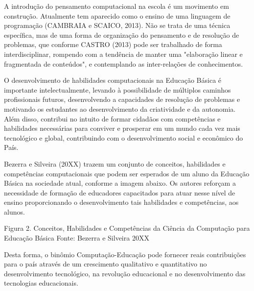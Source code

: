     
	A introdução do pensamento computacional na escola é um  movimento em construção. Atualmente tem aparecido como o ensino de uma linguagem de programação (CAMBRAIA e SCAICO, 2013). Não se trata de uma técnica específica, mas de uma forma de organização do pensamento e de resolução de problemas, que conforme CASTRO (2013) pode ser trabalhado de forma interdisciplinar, rompendo com a tendência de manter uma "elaboração linear e fragmentada de conteúdos", e contemplando as inter-relações de conhecimentos.
    
    
	O desenvolvimento de habilidades computacionais na Educação Básica é importante intelectualmente, levando à possibilidade de múltiplos caminhos profissionais futuros, desenvolvendo a capacidades de resolução de problemas e motivando os estudantes ao desenvolvimento da criatividade e da autonomia. Além disso, contribui no intuito de formar cidadãos com competências e habilidades necessárias para conviver e prosperar em um mundo cada vez mais tecnológico e global, contribuindo com o desenvolvimento social e econômico do País.
    
    
	Bezerra e Silveira (20XX) trazem um conjunto de conceitos, habilidades e competências computacionais que podem ser esperados de um aluno da Educação Básica na sociedade atual, conforme a imagem abaixo. Os autores reforçam a necessidade de formação de educadores capacitados para atuar nesse nível de ensino proporcionando o desenvolvimento tais habilidades e competências, aos alunos.
 
 
Figura 2. Conceitos, Habilidades e Competências da Ciência da Computação para Educação Básica Fonte: Bezerra e Silveira 20XX
 
	Desta forma,  o binômio Computação-Educação pode fornecer reais contribuições para o país através de um crescimento qualitativo e quantitativo no desenvolvimento tecnológico, na revolução educacional e no desenvolvimento das tecnologias educacionais.





